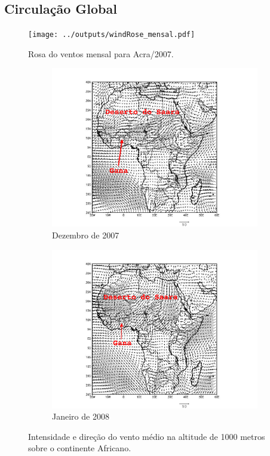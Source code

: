 \subsection{Circulação Global}

\begin{figure}[H]
  \centering
  \texttt{[image: ../outputs/windRose\_mensal.pdf]}
  \caption{Rosa do ventos mensal para Acra/2007. \label{fig:windRose_mensal}}
\end{figure}

\begin{figure}[H]
  \centering
  \begin{subfigure}[b]{0.5\linewidth}
    \includegraphics[width=\linewidth]{../inputs/grads/gimp/875hPa/DEZ_2007.pdf}
    \caption{Dezembro de 2007}
  \end{subfigure}%
  \begin{subfigure}[b]{0.5\linewidth}
    \includegraphics[width=\linewidth]{../inputs/grads/gimp/875hPa/JAN_2008.pdf}
    \caption{Janeiro de 2008}
  \end{subfigure}
  \caption{Intensidade e direção do vento médio na altitude de 1000 metros 
           sobre o continente Africano. \label{fig:ECMWF1000}}
\end{figure}

